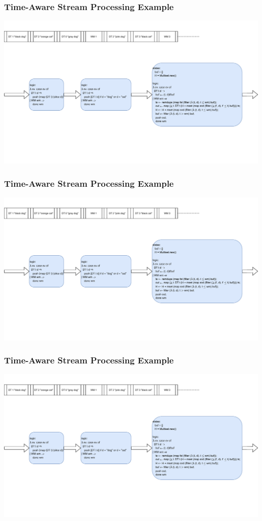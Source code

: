 \documentclass[aspectratio=169,10pt]{beamer}
\begin{document}
\begin{frame}
  \frametitle{Time-Aware Stream Processing Example}
    \includegraphics[page=11,width=.95\textwidth]{dataflow_ex1.pdf}
\end{frame}

\begin{frame}
  \frametitle{Time-Aware Stream Processing Example}
    \includegraphics[page=12,width=.95\textwidth]{dataflow_ex1.pdf}
\end{frame}

\begin{frame}
  \frametitle{Time-Aware Stream Processing Example}
    \includegraphics[page=13,width=.95\textwidth]{dataflow_ex1.pdf}
\end{frame}
\end{document}
